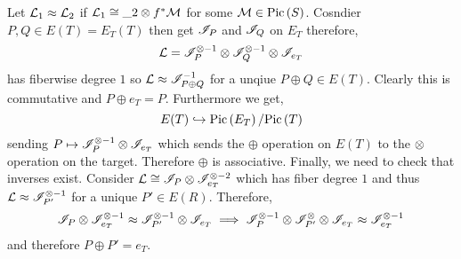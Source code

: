 \documentclass[12pt]{article}
\begin{document}
\begin{cor}
Let $\mathcal{L}_1 \approx \mathcal{L}_2$ if $\mathcal{L}_1 \cong \_2 \otimes f^* \mathcal{M}$ for some $\mathcal{M} \in \mathrm{Pic} \left( S \right)$. Cosndier $P, Q \in E(T) = E_T(T)$ then get $\mathscr{I}_P$ and $\mathscr{I}_Q$ on $E_T$ therefore,
\[ \mathcal{L} = \mathscr{I}_P^{\otimes - 1} \otimes \mathscr{I}_Q^{\otimes -1} \otimes \mathscr{I}_{e_T} \]
has fiberwise degree $1$ so $\mathcal{L} \approx \mathscr{I}^{-1}_{P \oplus Q}$ for a unqiue $P \oplus Q \in E(T)$. Clearly this is commutative and $P \oplus e_T = P$. Furthermore we get,
\[ E(T) \hookrightarrow \mathrm{Pic} \left( E_T \right) / \mathrm{Pic} \left( T \right) \]
sending $P \mapsto \mathscr{I}_P^{\otimes -1} \otimes \mathscr{I}_{e_T}$ which sends the $\oplus$ operation on $E(T)$ to the $\otimes$ operation on the target. Therefore $\oplus$ is associative. Finally, we need to check that inverses exist. Consider $\mathcal{L} \cong \mathscr{I}_P \otimes \mathscr{I}_{e_T}^{\otimes -2}$ which has fiber degree $1$ and thus $\mathcal{L} \approx \mathscr{I}_{P'}^{\otimes -1}$ for a unique $P' \in E(R)$. Therefore,
\[ \mathscr{I}_{P} \otimes \mathscr{I}_{e_T}^{\otimes -1} \approx \mathscr{I}_{P'}^{\otimes -1} \otimes \mathscr{I}_{e_T} \implies \mathscr{I}_P^{\otimes -1} \otimes \mathscr{I}_{P'}^{\otimes} \otimes \mathscr{I}_{e_T} \approx \mathscr{I}_{e_T}^{\otimes -1} \]
and therefore $P \oplus P' = e_T$.  
\end{cor}
\end{document}
